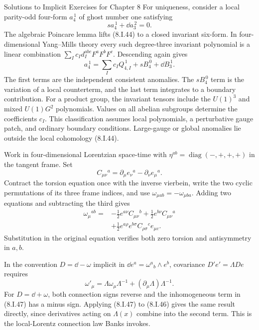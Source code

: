 \begin{bankssolutions}{Solutions to Implicit Exercises for Chapter 8}
For uniqueness, consider a local parity-odd four-form $a_4^{\,1}$ of ghost
number one satisfying
\[
 sa_4^{\,1}+\dd a_3^{\,2}=0. \tag{8.I.44}
\]
The algebraic Poincare lemma lifts (8.I.44) to a closed invariant six-form.
In four-dimensional Yang--Mills theory every such degree-three invariant
polynomial is a linear combination
$\sum_Ic_I d_I^{abc}F^aF^bF^c$.  Descending again gives
\[
 a_4^{\,1}=\sum_Ic_IQ_{4,I}^{\,1}
 +sB_4^{\,0}+\dd B_3^{\,1}. \tag{8.I.45}
\]
The first terms are the independent consistent anomalies.  The $sB_4^{\,0}$
term is the variation of a local counterterm, and the last term integrates to
a boundary contribution.  For a product group, the invariant tensors include
the $U(1)^3$ and mixed $U(1)G^2$ polynomials.  Values on all abelian subgroups
determine the coefficients $c_I$.  This classification assumes local
polynomials, a perturbative gauge patch, and ordinary boundary conditions.
Large-gauge or global anomalies lie outside the local cohomology (8.I.44).

Work in four-dimensional Lorentzian space-time with
$\eta^{ab}=\operatorname{diag}(-,+,+,+)$ in the tangent frame.
Set
\[
 C_{\mu\nu}{}^a=\partial_\mu e_\nu{}^a-
 \partial_\nu e_\mu{}^a.
\]
Contract the torsion equation once with the inverse vierbein, write the two
cyclic permutations of its three frame indices, and use
$\omega_{\mu ab}=-\omega_{\mu ba}$.  Adding two equations and subtracting the
third gives
\begin{align*}
 \omega_\mu{}^{ab}={}&-\frac12e^{a\nu}C_{\mu\nu}{}^b
 +\frac12e^{b\nu}C_{\mu\nu}{}^a\\
 &+\frac12e^{a\rho}e^{b\sigma}C_{\rho\sigma}{}^c e_{\mu c}.
 \tag{8.I.46}
\end{align*}
Substitution in the original equation verifies both zero torsion and
antisymmetry in $a,b$.

In the convention $D=\dd-\omega$ implicit in
$\dd e^a=\omega^a{}_b\wedge e^b$, covariance
$D'e'=\Lambda De$ requires
\[
 \omega'_\mu=\Lambda\omega_\mu\Lambda^{-1}
 +(\partial_\mu\Lambda)\Lambda^{-1}. \tag{8.I.47}
\]
For $D=\dd+\omega$, both connection signs reverse and the inhomogeneous term
in (8.I.47) has a minus sign.  Applying (8.I.47) to (8.I.46) gives the same
result directly, since derivatives acting on $\Lambda(x)$ combine into the
second term.  This is the local-Lorentz connection law Banks invokes.


\end{bankssolutions}
